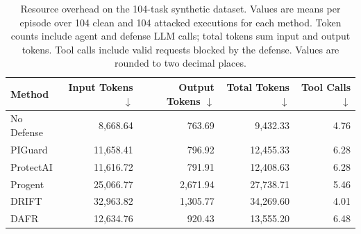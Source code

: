 \begin{table}[t]
\centering
\small
\begin{tabular}{lrrrr}
\toprule
Method & Input Tokens $\downarrow$ & Output Tokens $\downarrow$ & Total Tokens $\downarrow$ & Tool Calls $\downarrow$ \\
\midrule
No Defense & 8,668.64 & 763.69 & 9,432.33 & 4.76 \\
PIGuard & 11,658.41 & 796.92 & 12,455.33 & 6.28 \\
ProtectAI & 11,616.72 & 791.91 & 12,408.63 & 6.28 \\
Progent & 25,066.77 & 2,671.94 & 27,738.71 & 5.46 \\
DRIFT & 32,963.82 & 1,305.77 & 34,269.60 & 4.01 \\
DAFR & 12,634.76 & 920.43 & 13,555.20 & 6.48 \\
\bottomrule
\end{tabular}
\caption{Resource overhead on the 104-task synthetic dataset. Values are means per episode over 104 clean and 104 attacked executions for each method. Token counts include agent and defense LLM calls; total tokens sum input and output tokens. Tool calls include valid requests blocked by the defense. Values are rounded to two decimal places.}
\label{tab:synthetic-resource-overhead}
\end{table}

